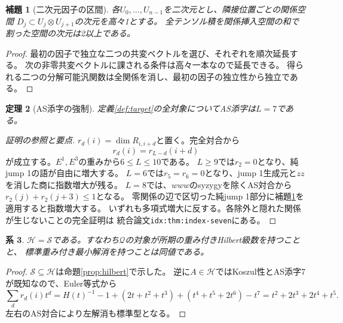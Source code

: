 \documentclass[11pt,a4paper]{ltjsarticle}
\newtheorem{theorem}{定理}[section]
\newtheorem{lemma}[theorem]{補題}
\newtheorem{corollary}[theorem]{系}
\theoremstyle{definition}
\begin{document}
\begin{lemma}[二次元因子の区間]\label{lem:segment}
各$U_0,\ldots,U_{n-1}$を二次元とし、隣接位置ごとの関係空間
$D_j\subset U_j\otimes U_{j+1}$の次元を高々1とする。
全テンソル積を関係挿入空間の和で割った空間の次元は2以上である。
\end{lemma}
\begin{proof}
最初の因子で独立な二つの共変ベクトルを選び、それぞれを順次延長する。
次の非零共変ベクトルに課される条件は高々一本なので延長できる。
得られる二つの分解可能汎関数は全関係を消し、最初の因子の独立性から独立である。
\end{proof}

\begin{theorem}[AS添字の強制]\label{thm:general-index}
定義\ref{def:target}の全対象についてAS添字は$L=7$である。
\end{theorem}
\begin{proof}[証明の参照と要点]
$r_d(i)=\dim R_{i,i+d}$と置く。完全対合から
\begin{equation}\label{eq:relation-symmetry}
r_d(i)=r_{L-d}(i+d)
\end{equation}
が成立する。$E^1,E^3$の重みから$6\leq L\leq10$である。
$L\geq9$では$r_2=0$となり、純jump 1の語が自由に増大する。
$L=6$では$r_5=r_6=0$となり、jump 1生成元と$zz$を消した商に指数増大が残る。
$L=8$では、$www$のsyzygyを除くAS対合から
$r_2(j)+r_2(j+3)\leq1$となる。
零関係の辺で区切った純jump 1部分に補題\ref{lem:segment}を適用すると指数増大する。
いずれも多項式増大に反する。各除外と隠れた関係が生じないことの完全証明は
統合論文\texttt{idx:thm:index-seven}にある。
\end{proof}

\begin{corollary}\label{cor:hilbert-standard}
$\mathcal H=\mathcal S$である。すなわち$\mathcal Q$の対象が所期の重み付きHilbert級数を持つことと、
標準重み付き最小解消を持つことは同値である。
\end{corollary}
\begin{proof}
$\mathcal S\subseteq\mathcal H$は命題\ref{prop:hilbert}で示した。
逆に$A\in\mathcal H$ではKoszul性とAS添字7が既知なので、Euler等式から
\[
\sum_d r_d(i)t^d
=H(t)^{-1}-1+(2t+t^2+t^3)+(t^4+t^5+2t^6)-t^7
=t^2+2t^3+2t^4+t^5.
\]
左右のAS対合により左解消も標準型となる。
\end{proof}
\end{document}
